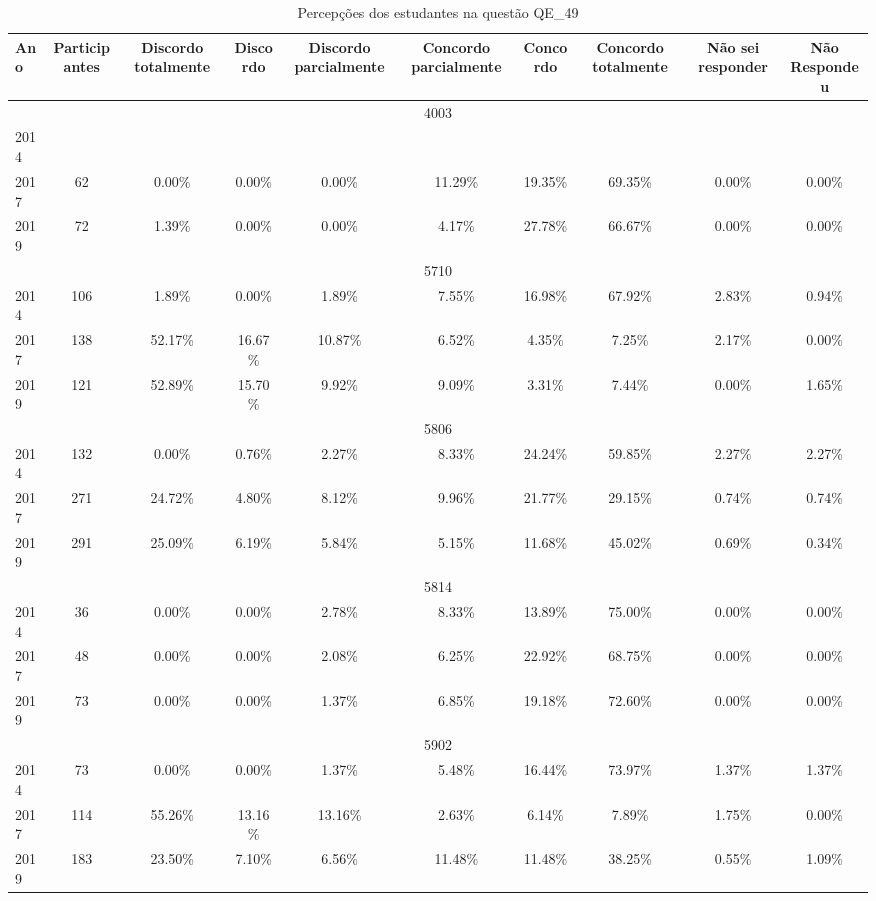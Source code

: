 \begin{table}[H]
\centering
\caption{Percepções dos estudantes na questão QE\_49}
\begin{tabular}{|l|c|ccc|ccc|cc|}
\hline
\toprule
Ano & Participantes & Discordo totalmente & Discordo & Discordo parcialmente & Concordo parcialmente & Concordo & Concordo totalmente & Não sei responder & Não Respondeu \\
\midrule
\hline
\multicolumn{10}{|c|}{4003}\\
\hline
2014 & & & & & & & & & \\
2017 & 62 & 0.00\% & 0.00\% & 0.00\% & 11.29\% & 19.35\% & 69.35\% & 0.00\% & 0.00\%\\
2019 & 72 & 1.39\% & 0.00\% & 0.00\% & 4.17\% & 27.78\% & 66.67\% & 0.00\% & 0.00\%\\
\hline
\hline
\multicolumn{10}{|c|}{5710}\\
\hline
2014 & 106 & 1.89\% & 0.00\% & 1.89\% & 7.55\% & 16.98\% & 67.92\% & 2.83\% & 0.94\%\\
2017 & 138 & 52.17\% & 16.67\% & 10.87\% & 6.52\% & 4.35\% & 7.25\% & 2.17\% & 0.00\%\\
2019 & 121 & 52.89\% & 15.70\% & 9.92\% & 9.09\% & 3.31\% & 7.44\% & 0.00\% & 1.65\%\\
\hline
\hline
\multicolumn{10}{|c|}{5806}\\
\hline
2014 & 132 & 0.00\% & 0.76\% & 2.27\% & 8.33\% & 24.24\% & 59.85\% & 2.27\% & 2.27\%\\
2017 & 271 & 24.72\% & 4.80\% & 8.12\% & 9.96\% & 21.77\% & 29.15\% & 0.74\% & 0.74\%\\
2019 & 291 & 25.09\% & 6.19\% & 5.84\% & 5.15\% & 11.68\% & 45.02\% & 0.69\% & 0.34\%\\
\hline
\hline
\multicolumn{10}{|c|}{5814}\\
\hline
2014 & 36 & 0.00\% & 0.00\% & 2.78\% & 8.33\% & 13.89\% & 75.00\% & 0.00\% & 0.00\%\\
2017 & 48 & 0.00\% & 0.00\% & 2.08\% & 6.25\% & 22.92\% & 68.75\% & 0.00\% & 0.00\%\\
2019 & 73 & 0.00\% & 0.00\% & 1.37\% & 6.85\% & 19.18\% & 72.60\% & 0.00\% & 0.00\%\\
\hline
\hline
\multicolumn{10}{|c|}{5902}\\
\hline
2014 & 73 & 0.00\% & 0.00\% & 1.37\% & 5.48\% & 16.44\% & 73.97\% & 1.37\% & 1.37\%\\
2017 & 114 & 55.26\% & 13.16\% & 13.16\% & 2.63\% & 6.14\% & 7.89\% & 1.75\% & 0.00\%\\
2019 & 183 & 23.50\% & 7.10\% & 6.56\% & 11.48\% & 11.48\% & 38.25\% & 0.55\% & 1.09\%\\

\end{tabular}
\end{table}
